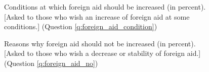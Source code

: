 \begin{bibunit}
\begin{figure}[h!]
  \caption[Conditions at which foreign aid should be increased]{Conditions at which foreign aid should be increased (in percent). [Asked to those who wish an increase of foreign aid at some conditions.] (Question \ref{q:foreign_aid_condition})}\label{fig:foreign_aid_condition}
\end{figure}

\begin{figure}[h!]
  \caption[Reasons why foreign aid should not be increased]{Reasons why foreign aid should not be increased (in percent). [Asked to those who wish a decrease or stability of foreign aid.] (Question \ref{q:foreign_aid_no})}\label{fig:foreign_aid_no}
\end{figure}


 

\renewcommand{\url}[1]{\href{#1}{Link}} 
\putbib
\end{bibunit}

